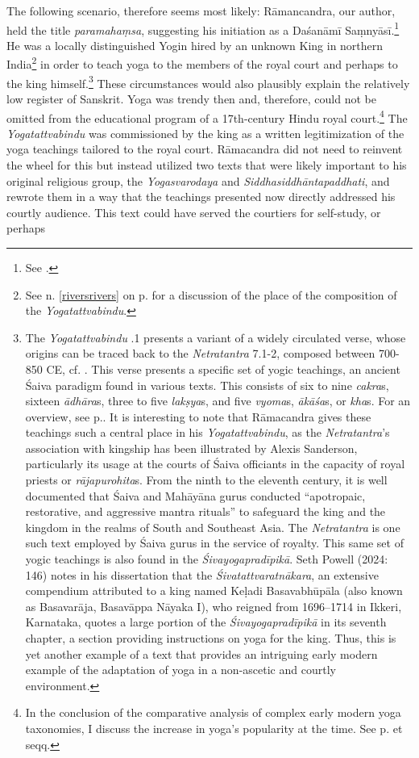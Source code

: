 The following scenario, therefore seems most likely: Rāmancandra, our author, held the title \textit{paramahaṃsa}, suggesting his initiation as a Daśanāmī Saṃnyāsī.\footnote{See \citeauthor[2006: 42-45]{clark2006}.} He was a locally distinguished Yogin hired by an unknown King in northern India\footnote{See n. \ref{riversrivers} on p. \pageref{riversrivers} for a discussion of the place of the composition of the \emph{Yogatattvabindu}.} in order to teach yoga to the members of the royal court and perhaps to the king himself.\footnote{The \emph{Yogatattvabindu} .1 presents a variant of a widely circulated verse, whose origins can be traced back to the \emph{Netratantra} 7.1-2, composed between 700-850 CE, cf. \citeauthor[2004: 243]{sanderson2004}. This verse presents a specific set of yogic teachings, an ancient Śaiva paradigm found in various texts. This consists of six to nine \textit{cakra}s, sixteen \textit{ādhāra}s, three to five \textit{lakṣya}s, and five \textit{vyoma}s, \textit{ākāśa}s, or \textit{kha}s. For an overview, see p.\pageref{saubhadraverse}. It is interesting to note that Rāmacandra gives these teachings such a central place in his \emph{Yogatattvabindu}, as the \emph{Netratantra}'s association with kingship has been illustrated by Alexis Sanderson, particularly its usage at the courts of Śaiva officiants in the capacity of royal priests or \textit{rājapurohita}s. From the ninth to the eleventh century, it is well documented that Śaiva and Mahāyāna gurus conducted ``apotropaic, restorative, and aggressive mantra rituals'' to safeguard the king and the kingdom in the realms of South and Southeast Asia. The \emph{Netratantra}\nocite{netratantra} is one such text employed by Śaiva gurus in the service of royalty. This same set of yogic teachings is also found in the \emph{Śivayogapradīpikā}. Seth Powell (2024: 146) notes in his dissertation that the \emph{Śivatattvaratnākara}, an extensive compendium attributed to a king named Keḷadi Basavabhūpāla (also known as Basavarāja, Basavāppa Nāyaka I), who reigned from 1696–1714 in Ikkeri, Karnataka, quotes a large portion of the \emph{Śivayogapradīpikā} in its seventh chapter, a section providing instructions on yoga for the king. Thus, this is yet another example of a text that provides an intriguing early modern example of the adaptation of yoga in a non-ascetic and courtly environment.} These circumstances would also plausibly explain the relatively low register of Sanskrit. Yoga was trendy then and, therefore, could not be omitted from the educational program of a 17th-century Hindu royal court.\footnote{In the conclusion of the comparative analysis of complex early modern yoga taxonomies, I discuss the increase in yoga's popularity at the time. See p. \pageref{comparisonconclusion} et seqq.} The \emph{Yogatattvabindu} was commissioned by the king as a written legitimization of the yoga teachings tailored to the royal court. Rāmacandra did not need to reinvent the wheel for this but instead utilized two texts that were likely important to his original religious group, the \emph{Yogasvarodaya} and \emph{Siddhasiddhāntapaddhati}, and rewrote them in a way that the teachings presented now directly addressed his courtly audience. This text could have served the courtiers for self-study, or perhaps 